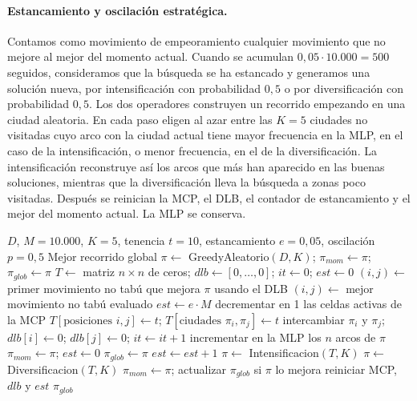 \paragraph{Estancamiento y oscilación estratégica.} Contamos como movimiento de empeoramiento cualquier movimiento que no mejore al mejor del momento actual. Cuando se acumulan $0{,}05 \cdot 10.000 = 500$ seguidos, consideramos que la búsqueda se ha estancado y generamos una solución nueva, por intensificación con probabilidad $0{,}5$ o por diversificación con probabilidad $0{,}5$. Los dos operadores construyen un recorrido empezando en una ciudad aleatoria. En cada paso eligen al azar entre las $K = 5$ ciudades no visitadas cuyo arco con la ciudad actual tiene mayor frecuencia en la MLP, en el caso de la intensificación, o menor frecuencia, en el de la diversificación. La intensificación reconstruye así los arcos que más han aparecido en las buenas soluciones, mientras que la diversificación lleva la búsqueda a zonas poco visitadas. Después se reinician la MCP, el DLB, el contador de estancamiento y el mejor del momento actual. La MLP se conserva.

\begin{algorithm}[H]
\caption{Búsqueda tabú}
\begin{algorithmic}[1]
\Require $D$, $M = 10.000$, $K = 5$, tenencia $t = 10$, estancamiento $e = 0{,}05$, oscilación $p = 0{,}5$
\Ensure Mejor recorrido global
\State $\pi \gets$ GreedyAleatorio$(D, K)$; \quad $\pi_{mom} \gets \pi$; \quad $\pi_{glob} \gets \pi$
\State $T \gets$ matriz $n \times n$ de ceros; \quad $dlb \gets [0, \dots, 0]$; \quad $it \gets 0$; \quad $est \gets 0$
    \State $(i, j) \gets$ primer movimiento no tabú que mejora $\pi$ usando el DLB
        \State $(i, j) \gets$ mejor movimiento no tabú evaluado 
    \EndIf
        \State $est \gets e \cdot M$ 
    \Else
        \State decrementar en 1 las celdas activas de la MCP
        \State $T[\text{posiciones } i,j] \gets t$; \quad $T[\text{ciudades } \pi_i, \pi_j] \gets t$
        \State intercambiar $\pi_i$ y $\pi_j$; \quad $dlb[i] \gets 0$; \quad $dlb[j] \gets 0$; \quad $it \gets it + 1$
        \State incrementar en la MLP los $n$ arcos de $\pi$
            \State $\pi_{mom} \gets \pi$; \quad $est \gets 0$
             $\pi_{glob} \gets \pi$ \EndIf
        \Else
            \State $est \gets est + 1$
        \EndIf
    \EndIf
            \State $\pi \gets$ Intensificacion$(T, K)$
        \Else
            \State $\pi \gets$ Diversificacion$(T, K)$
        \EndIf
        \State $\pi_{mom} \gets \pi$; \quad actualizar $\pi_{glob}$ si $\pi$ lo mejora
        \State reiniciar MCP, $dlb$ y $est$ 
    \EndIf
\EndWhile
\State \Return $\pi_{glob}$
\end{algorithmic}
\end{algorithm}

